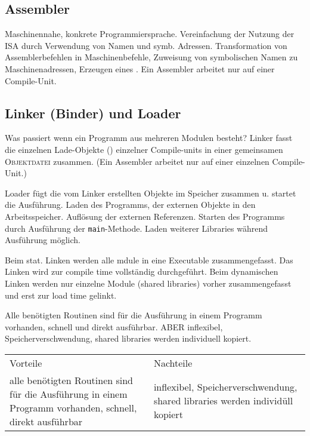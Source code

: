 \subsection{Assembler}
Maschinennahe, konkrete Programmiersprache. Vereinfachung der Nutzung der ISA durch Verwendung von Namen und symb. Adressen.
Transformation von Assemblerbefehlen in Maschinenbefehle, Zuweisung von symbolischen Namen zu Maschinenadressen, Erzeugen eines . Ein Assembler arbeitet nur auf einer Compile-Unit.

\subsection{Linker (Binder) und Loader}
Was passiert wenn ein Programm aus mehreren Modulen besteht?
Linker fasst die einzelnen Lade-Objekte () einzelner Compile-units in einer gemeinsamen \textsc{Objektdatei} zusammen. (Ein Assembler arbeitet nur auf einer einzelnen Compile-Unit.)

Loader fügt die vom Linker erstellten Objekte im Speicher zusammen u. startet die Ausführung. Laden des Programms, der externen Objekte in den Arbeitsspeicher. Auflösung der externen Referenzen. Starten des Programms durch Ausführung der \texttt{main}-Methode. Laden weiterer Libraries während Ausführung möglich.

Beim stat. Linken werden alle mdule in eine Executable zusammengefasst. Das Linken wird zur compile time vollständig durchgeführt. Beim dynamischen Linken werden nur einzelne Module (shared libraries) vorher zusammengefasst und erst zur load time gelinkt.

Alle benötigten Routinen sind für die Ausführung in einem Programm vorhanden, schnell und direkt ausführbar. ABER inflexibel, Speicherverschwendung, shared libraries werden individuell kopiert.

\begin{tabularx}{\textwidth}{X X}
	Vorteile& Nachteile\\
	alle benötigten Routinen sind für die Ausführung in einem Programm vorhanden, schnell, direkt ausführbar& inflexibel, Speicherverschwendung, shared libraries werden individüll kopiert\\
\end{tabularx}
